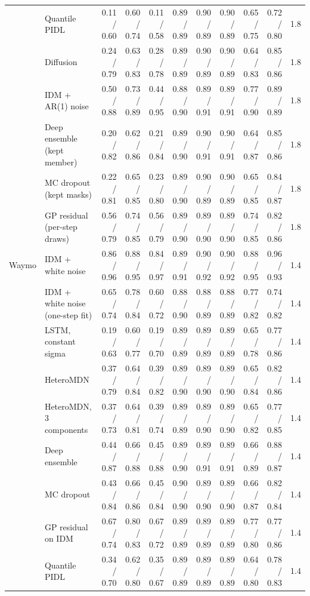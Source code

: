 \begin{longtable}{llrrrrrrrrr}
 & Quantile PIDL & 0.11 / 0.60 & 0.60 / 0.74 & 0.11 / 0.58 & 0.89 / 0.89 & 0.90 / 0.89 & 0.90 / 0.89 & 0.65 / 0.75 & 0.72 / 0.80 & 1.8 \\
 & Diffusion & 0.24 / 0.79 & 0.63 / 0.83 & 0.28 / 0.78 & 0.89 / 0.89 & 0.90 / 0.89 & 0.90 / 0.89 & 0.64 / 0.83 & 0.85 / 0.86 & 1.8 \\
 & IDM + AR(1) noise & 0.50 / 0.88 & 0.73 / 0.89 & 0.44 / 0.95 & 0.88 / 0.90 & 0.89 / 0.91 & 0.89 / 0.91 & 0.77 / 0.90 & 0.89 / 0.89 & 1.8 \\
 & Deep ensemble (kept member) & 0.20 / 0.82 & 0.62 / 0.86 & 0.21 / 0.84 & 0.89 / 0.90 & 0.90 / 0.91 & 0.90 / 0.91 & 0.64 / 0.87 & 0.85 / 0.86 & 1.8 \\
 & MC dropout (kept masks) & 0.22 / 0.81 & 0.65 / 0.85 & 0.23 / 0.80 & 0.89 / 0.90 & 0.90 / 0.89 & 0.90 / 0.89 & 0.65 / 0.85 & 0.84 / 0.87 & 1.8 \\
 & GP residual (per-step draws) & 0.56 / 0.79 & 0.74 / 0.85 & 0.56 / 0.79 & 0.89 / 0.90 & 0.89 / 0.90 & 0.89 / 0.90 & 0.74 / 0.85 & 0.82 / 0.86 & 1.8 \\
\midrule
Waymo & IDM + white noise & 0.86 / 0.96 & 0.88 / 0.95 & 0.84 / 0.97 & 0.89 / 0.91 & 0.90 / 0.92 & 0.90 / 0.92 & 0.88 / 0.95 & 0.96 / 0.93 & 1.4 \\
 & IDM + white noise (one-step fit) & 0.65 / 0.74 & 0.78 / 0.84 & 0.60 / 0.72 & 0.88 / 0.90 & 0.88 / 0.89 & 0.88 / 0.89 & 0.77 / 0.82 & 0.74 / 0.82 & 1.4 \\
 & LSTM, constant sigma & 0.19 / 0.63 & 0.60 / 0.77 & 0.19 / 0.70 & 0.89 / 0.89 & 0.89 / 0.89 & 0.89 / 0.89 & 0.65 / 0.78 & 0.77 / 0.86 & 1.4 \\
 & HeteroMDN & 0.37 / 0.79 & 0.64 / 0.84 & 0.39 / 0.82 & 0.89 / 0.90 & 0.89 / 0.90 & 0.89 / 0.90 & 0.65 / 0.84 & 0.82 / 0.86 & 1.4 \\
 & HeteroMDN, 3 components & 0.37 / 0.73 & 0.64 / 0.81 & 0.39 / 0.74 & 0.89 / 0.89 & 0.89 / 0.90 & 0.89 / 0.90 & 0.65 / 0.82 & 0.77 / 0.85 & 1.4 \\
 & Deep ensemble & 0.44 / 0.87 & 0.66 / 0.88 & 0.45 / 0.88 & 0.89 / 0.90 & 0.89 / 0.91 & 0.89 / 0.91 & 0.66 / 0.89 & 0.88 / 0.87 & 1.4 \\
 & MC dropout & 0.43 / 0.84 & 0.66 / 0.86 & 0.45 / 0.84 & 0.90 / 0.90 & 0.89 / 0.90 & 0.89 / 0.90 & 0.66 / 0.87 & 0.82 / 0.84 & 1.4 \\
 & GP residual on IDM & 0.67 / 0.74 & 0.80 / 0.83 & 0.67 / 0.72 & 0.89 / 0.89 & 0.89 / 0.89 & 0.89 / 0.89 & 0.77 / 0.80 & 0.77 / 0.86 & 1.4 \\
 & Quantile PIDL & 0.34 / 0.70 & 0.62 / 0.80 & 0.35 / 0.67 & 0.89 / 0.89 & 0.89 / 0.89 & 0.89 / 0.89 & 0.64 / 0.80 & 0.78 / 0.83 & 1.4 \\

\end{longtable}
